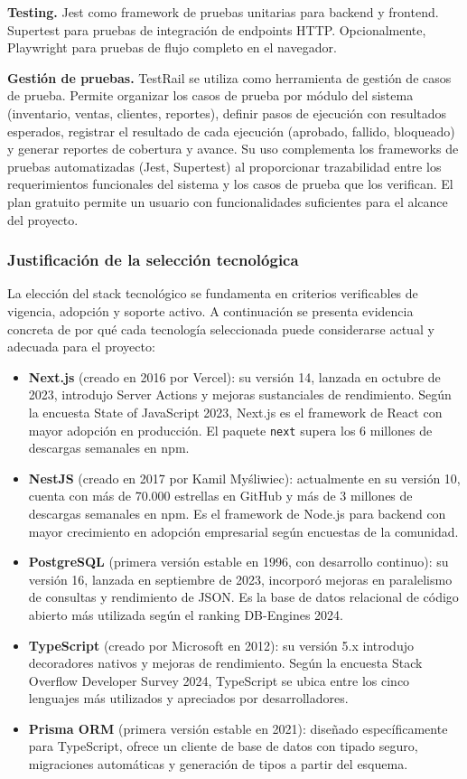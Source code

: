 \documentclass[spanish]{ieee_upb}
\begin{document}
\textbf{Testing.} Jest como framework de pruebas unitarias para backend y frontend. Supertest para pruebas de integración de endpoints HTTP. Opcionalmente, Playwright para pruebas de flujo completo en el navegador.

\textbf{Gestión de pruebas.} TestRail se utiliza como herramienta de gestión de casos de prueba. Permite organizar los casos de prueba por módulo del sistema (inventario, ventas, clientes, reportes), definir pasos de ejecución con resultados esperados, registrar el resultado de cada ejecución (aprobado, fallido, bloqueado) y generar reportes de cobertura y avance. Su uso complementa los frameworks de pruebas automatizadas (Jest, Supertest) al proporcionar trazabilidad entre los requerimientos funcionales del sistema y los casos de prueba que los verifican. El plan gratuito permite un usuario con funcionalidades suficientes para el alcance del proyecto.

\subsubsection{Justificación de la selección tecnológica}

La elección del stack tecnológico se fundamenta en criterios verificables de vigencia, adopción y soporte activo. A continuación se presenta evidencia concreta de por qué cada tecnología seleccionada puede considerarse actual y adecuada para el proyecto:

\begin{itemize}
	\item \textbf{Next.js} (creado en 2016 por Vercel): su versión 14, lanzada en octubre de 2023, introdujo Server Actions y mejoras sustanciales de rendimiento. Según la encuesta State of JavaScript 2023, Next.js es el framework de React con mayor adopción en producción. El paquete \texttt{next} supera los 6 millones de descargas semanales en npm.
	\item \textbf{NestJS} (creado en 2017 por Kamil My\'{s}liwiec): actualmente en su versión 10, cuenta con más de 70.000 estrellas en GitHub y más de 3 millones de descargas semanales en npm. Es el framework de Node.js para backend con mayor crecimiento en adopción empresarial según encuestas de la comunidad.
	\item \textbf{PostgreSQL} (primera versión estable en 1996, con desarrollo continuo): su versión 16, lanzada en septiembre de 2023, incorporó mejoras en paralelismo de consultas y rendimiento de JSON. Es la base de datos relacional de código abierto más utilizada según el ranking DB-Engines 2024.
	\item \textbf{TypeScript} (creado por Microsoft en 2012): su versión 5.x introdujo decoradores nativos y mejoras de rendimiento. Según la encuesta Stack Overflow Developer Survey 2024, TypeScript se ubica entre los cinco lenguajes más utilizados y apreciados por desarrolladores.
	\item \textbf{Prisma ORM} (primera versión estable en 2021): diseñado específicamente para TypeScript, ofrece un cliente de base de datos con tipado seguro, migraciones automáticas y generación de tipos a partir del esquema.
\end{itemize}
\end{document}
